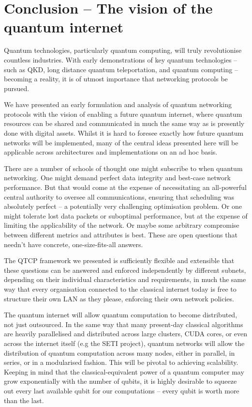 %
%

\section{Conclusion -- The vision of the quantum internet} \label{sec:vision_quant} 

Quantum technologies, particularly quantum computing, will truly revolutionise countless industries. With early demonstrations of key quantum technologies -- such as QKD, long distance quantum teleportation, and quantum computing -- becoming a reality, it is of utmost importance that networking protocols be pursued.

We have presented an early formulation and analysis of quantum networking protocols with the vision of enabling a future quantum internet, where quantum resources can be shared and communicated in much the same way as is presently done with digital assets. Whilst it is hard to foresee exactly how future quantum networks will be implemented, many of the central ideas presented here will be applicable across architectures and implementations on an ad hoc basis.

There are a number of schools of thought one might subscribe to when quantum networking. One might demand perfect data integrity and best-case network performance. But that would come at the expense of necessitating an all-powerful central authority to oversee all communications, ensuring that scheduling was absolutely perfect -- a potentially very challenging optimisation problem. Or one might tolerate lost data packets or suboptimal performance, but at the expense of limiting the applicability of the network. Or maybe some arbitrary compromise between different metrics and attributes is best. These are open questions that needn't have concrete, one-size-fits-all answers.

The QTCP framework we presented is sufficiently flexible and extensible that these questions can be answered and enforced independently by different subnets, depending on their individual characteristics and requirements, in much the same way that every organisation connected to the classical internet today is free to structure their own LAN as they please, enforcing their own network policies.

The quantum internet will allow quantum computation to become distributed, not just outsourced. In the same way that many present-day classical algorithms are heavily parallelised and distributed across large clusters, CUDA cores, or even across the internet itself (e.g the SETI project), quantum networks will allow the distribution of quantum computation across many nodes, either in parallel, in series, or in a modularised fashion. This will be pivotal to achieving scalability. Keeping in mind that the classical-equivalent power of a quantum computer may grow exponentially with the number of qubits, it is highly desirable to squeeze out every last available qubit for our computations -- every qubit is worth more than the last.


